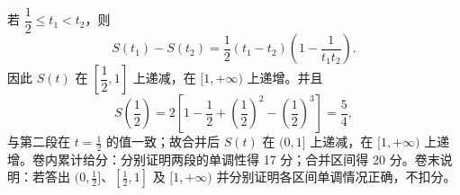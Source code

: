 \begin{answer}
若 $\dfrac12\le t_1<t_2$，则
\nopagebreak[4]
\[
S(t_1)-S(t_2)=\frac12(t_1-t_2)\left(1-\frac1{t_1t_2}\right).
\]
因此 $S(t)$ 在 $[\dfrac12,1]$ 上递减，在 $[1,+\infty)$ 上递增。并且
\nopagebreak[4]
\[
S\left(\frac12\right)=2\left[1-\frac12+\left(\frac12\right)^2-\left(\frac12\right)^3\right]=\frac54,
\]
与第二段在 $t=\frac12$ 的值一致；故合并后 $S(t)$ 在 $(0,1]$ 上递减，在 $[1,+\infty)$ 上递增。卷内累计给分：分别证明两段的单调性得 17 分；合并区间得 20 分。卷末说明：若答出 $(0,\frac12]$、$[\frac12,1]$ 及 $[1,+\infty)$ 并分别证明各区间单调情况正确，不扣分。



\gkanswer{答案（3）：$S(t)$ 在 $(0,1]$ 上为减函数，在 $[1,+\infty)$ 上为增函数}

\end{answer}